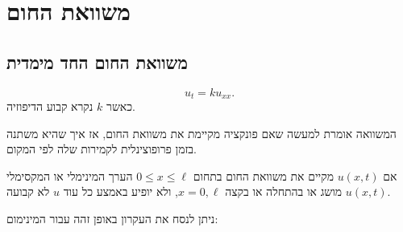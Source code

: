 \documentclass{tstextbook}
\begin{document}
\section{משוואת החום}

\subsection{משוואת החום החד מימדית}

\begin{definition}
$$u_{t}=k u_{x x}.$$
כאשר \(k\) נקרא קבוע הדיפוזיה. 

\end{definition}
\begin{remark}
המשוואה אומרת למעשה שאם פונקציה מקיימת את משוואת החום, אז איך שהיא משתנה בזמן פרופוצינלית לקמירות שלה לפי המקום. 

\end{remark}
\begin{proposition}
אם \(u(x,t)\) מקיים את משוואת החום בתחום \(0\leq x\leq \ell\) הערך המינימלי או המקסימלי \(u(x,t)\) מושג או בהתחלה או בקצה \(x=0,\ell\), ולא יופיע באמצע כל עוד \(u\) לא קבועה.

\end{proposition}
ניתן לנסח את העקרון באופן זהה עבור המינימום:
\end{document}
